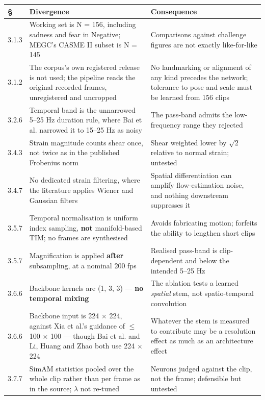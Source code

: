 \begin{table}[htbp]
	\centering
	\footnotesize
	\begin{tabular}{@{}p{0.85cm} p{6.0cm} p{6.6cm}@{}}
		\hline
		\textbf{\S} & \textbf{Divergence} & \textbf{Consequence} \\
		\hline
		3.1.3 & Working set is N = 156, including sadness and fear in Negative; MEGC's CASME II subset is N = 145 & Comparisons against challenge figures are not exactly like-for-like \\
		3.1.2 & The corpus's own registered release is not used; the pipeline reads the original recorded frames, unregistered and uncropped & No landmarking or alignment of any kind precedes the network; tolerance to pose and scale must be learned from 156 clips \\
		3.2.6 & Temporal band is the unnarrowed 5--25 Hz duration rule, where Bai et al. narrowed it to 15--25 Hz as noisy & The pass-band admits the low-frequency range they rejected \\
		3.4.3 & Strain magnitude counts shear once, not twice as in the published Frobenius norm & Shear weighted lower by $\sqrt{2}$ relative to normal strain; untested \\
		3.4.7 & No dedicated strain filtering, where the literature applies Wiener and Gaussian filters & Spatial differentiation can amplify flow-estimation noise, and nothing downstream suppresses it \\
		3.5.7 & Temporal normalisation is uniform index sampling, \textbf{not} manifold-based TIM; no frames are synthesised & Avoids fabricating motion; forfeits the ability to lengthen short clips \\
		3.5.7 & Magnification is applied \textbf{after} subsampling, at a nominal 200 fps & Realised pass-band is clip-dependent and below the intended 5--25 Hz \\
		3.6.6 & Backbone kernels are (1, 3, 3) --- \textbf{no temporal mixing} & The ablation tests a learned \textit{spatial} stem, not spatio-temporal convolution \\
		3.6.6 & Backbone input is 224 $\times$ 224, against Xia et al.'s guidance of $\leq$ 100 $\times$ 100 --- though Bai et al. and Li, Huang and Zhao both use 224 $\times$ 224 & Whatever the stem is measured to contribute may be a resolution effect as much as an architecture effect \\
		3.7.7 & SimAM statistics pooled over the whole clip rather than per frame as in the source; $\lambda$ not re-tuned & Neurons judged against the clip, not the frame; defensible but untested \\

\end{tabular}
\end{table}
